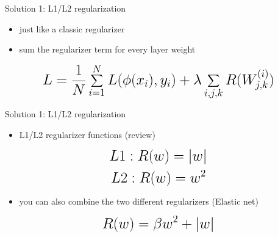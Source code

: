 \begin{frame}{Solution 1: L1/L2 regularization}
    \begin{itemize}
        \item just like a classic regularizer
        \item sum the regularizer term for every layer weight
    \end{itemize}
    \vspace{0.2\textheight}
    \begin{equation*}
        \mathlarger{\mathlarger{\mathlarger{
        L = \frac{1}{N} \sum_{i=1}^{N} L(\phi(x_i), y_i) + \lambda \sum_{i,j,k} R(W_{j,k}^{(i)})
        }}}
    \end{equation*}
\end{frame}
\begin{frame}{Solution 1: L1/L2 regularization}
    \begin{itemize}
        \item L1/L2 regularizer functions (review)
    \end{itemize}
    \vspace{0.1\textheight}
    \begin{equation*}
        \mathlarger{\mathlarger{\mathlarger{
            L1: R(w) = \vert w\vert
        }}}
    \end{equation*}
    \begin{equation*}
        \mathlarger{\mathlarger{\mathlarger{
            L2: R(w) = w^2
        }}}
    \end{equation*}
    \begin{itemize}
        \item you can also combine the two different regularizers (Elastic net)
    \end{itemize}
    \vspace{0.1\textheight}
    \begin{equation*}
        \mathlarger{\mathlarger{\mathlarger{
        R(w) = \beta w^2 + \vert w\vert
        }}}
    \end{equation*}
\end{frame}

